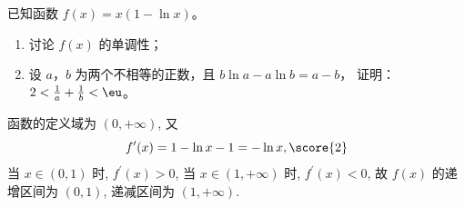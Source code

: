 \documentclass{exam-zh}
\begin{document}
\begin{problem}[points = 12]
  已知函数 $f(x) = x (1 - \ln x)$。
  \begin{enumerate}
    \item 讨论 $f(x)$ 的单调性；
    \item 设 $a$，$b$ 为两个不相等的正数，且 $b \ln a - a \ln b = a - b$，
      证明：$2 < \frac{1}{a} + \frac{1}{b} < \eu$。
  \end{enumerate}
\end{problem}

\begin{solution}
  函数的定义域为 $(0, +\infty)$,
  又 \[f^{\prime}(x) = 1 - \ln x-1 = -\ln x, \score{2}\]
  当 $x \in(0, 1)$ 时, $f^{\prime}(x) > 0$, 当 $x \in(1, +\infty)$ 时, $f^{\prime}(x) < 0$,
  故 $f(x)$ 的递增区间为 $(0,1)$, 递减区间为 $(1, +\infty)$.
\end{solution}
\end{document}

